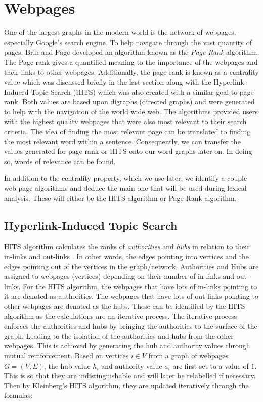 \section{Webpages}
One of the largest graphs in the modern world is the network of webpages, especially Google's search engine. To help navigate through the vast quantity of pages, Brin and Page \cite{brin1998anatomy} developed an algorithm known as the \emph{Page Rank} algorithm. The Page rank gives a quantified meaning to the importance of the webpages and their links to other webpages. Additionally, the page rank is known as a centrality value which was discussed briefly in the last section along with the Hyperlink-Induced Topic Search (HITS) which was also created with a similar goal to page rank. Both values are based upon digraphs (directed graphs) and were generated to help with the navigation of the world wide web. The algorithms provided users with the highest quality webpages that were also most relevant to their search criteria. The idea of finding the most relevant page can be translated to finding the most relevant word within a sentence. Consequently, we can transfer the values generated for page rank or HITS onto our word graphs later on. In doing so, words of relevance can be found.

In addition to the centrality property, which we use later, we identify a couple web page algorithms and deduce the main one that will be used during lexical analysis. These will either be the HITS algorithm or Page Rank algorithm.

\subsection{Hyperlink-Induced Topic Search}
HITS algorithm calculates the ranks of \emph{authorities} and \emph{hubs} in relation to their in-links and out-links \cite{langville2005survey}. In other words, the edges pointing into vertices and the edges pointing out of the vertices in the graph/network.  Authorities and Hubs are assigned to webpages (vertices) depending on their number of in-links and out-links. For the HITS algorithm, the webpages that have lots of in-links pointing to it are denoted as authorities. The webpages that have lots of out-links pointing to other webpages are denoted as the hubs. These can be identified by the HITS algorithm as the calculations are an iterative process. The iterative process enforces the authorities and hubs by bringing the authorities to the surface of the graph. Leading to the isolation of the authorities and hubs from the other webpages. This is achieved by generating the hub and authority values through mutual reinforcement. Based on vertices $i \in V$ from a graph of webpages $G = (V , E)$, the hub value $h_i$ and authority value $a_i$ are first set to a value of 1. This is so that they are indistinguishable and will later be relabelled if necessary. Then by Kleinberg's HITS algorithm, they are updated iteratively through the formulas:

